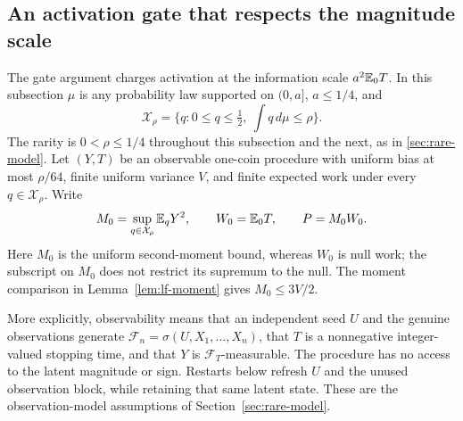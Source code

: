 \subsection{An activation gate that respects the magnitude scale}

The gate argument charges activation at the information
scale \(a^2\mathbb E_0T\).  In this subsection \(\mu\) is any probability law
supported on \((0,a]\), \(a\le1/4\), and
\[
 \mathcal X_\rho=
 \{q:0\le q\le\tfrac12,\ \textstyle\int q\,d\mu\le\rho\}.
\]
The rarity is $0<\rho\le1/4$ throughout this subsection and the next,
as in \cref{sec:rare-model}.
Let \((Y,T)\) be an observable one-coin procedure with uniform bias at
most \(\rho/64\), finite uniform variance \(V\), and finite expected work
under every \(q\in\mathcal X_\rho\).  Write
\[
 M_0=\sup_{q\in\mathcal X_\rho}\mathbb E_qY^2,\qquad
 W_0=\mathbb E_0T,\qquad P=M_0W_0.
\]
Here $M_0$ is the uniform second-moment bound, whereas $W_0$ is
null work; the subscript on $M_0$ does not restrict its supremum to the null.
The moment comparison in Lemma~\ref{lem:lf-moment} gives
\(M_0\le3V/2\).

More explicitly, observability means that an independent seed $U$ and
the genuine observations generate $\mathcal F_n=\sigma(U,X_1,\ldots,X_n)$,
that $T$ is a nonnegative integer-valued stopping time, and that $Y$ is
$\mathcal F_T$-measurable. The procedure has no access to the latent
magnitude or sign. Restarts below refresh $U$ and the unused observation
block, while retaining that same latent state. These are the observation-model assumptions of
Section~\ref{sec:rare-model}.

